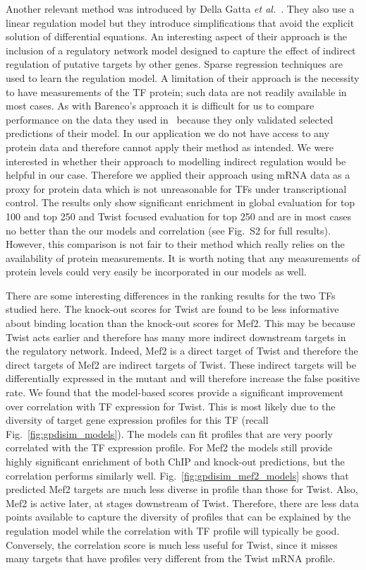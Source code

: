 \documentclass{pnastwo}
\begin{document}
\begin{article}
Another relevant method was introduced by Della Gatta {\em et
  al.}~\cite{Gatta2008}. They also use a linear regulation model but
they introduce simplifications that avoid the explicit solution of
differential equations. An interesting aspect of their approach is the
inclusion of a regulatory network model designed to capture the effect
of indirect regulation of putative targets by other genes. Sparse regression
techniques are used to learn the regulation model. A limitation of
their approach is the necessity to have measurements of the TF
protein; such data are not readily available in most cases. As with
Barenco's approach it is difficult for us to compare performance on
the data they used in~\cite{Gatta2008} because they only validated
selected predictions of their model. In our application we do not have
access to any protein data and therefore cannot apply their method as
intended. We were interested in whether
their approach to modelling indirect regulation would be helpful in
our case. Therefore we applied their approach using mRNA data as a
proxy for protein data which is not unreasonable for TFs under
transcriptional control. The results only show significant
enrichment in global evaluation for top 100 and top 250 and Twist
focused evaluation for top 250 and are in most cases no better than
the our models and correlation (see Fig.~S2 for full
results).
However, this comparison is
not fair to their method which really relies on the
availability of protein measurements.
It is worth noting that any measurements of
protein levels could very easily be incorporated in our models as well.

There are some interesting differences in the ranking results for the two TFs studied
here. The knock-out scores for Twist are found to be less informative
about binding location than the knock-out scores for Mef2. This may be
because Twist acts earlier and therefore has many more indirect
downstream targets in the regulatory network. Indeed, Mef2 is a
direct target of Twist and therefore the direct targets of Mef2 are
indirect targets of Twist. These indirect targets will be
differentially expressed in the mutant and will therefore increase the
false positive rate. We found that the model-based scores provide 
a significant improvement over correlation with TF expression for Twist. 
This is most likely due to the diversity of target gene expression profiles
 for this TF (recall Fig.~\ref{fig:gpdisim_models}). The models can fit 
profiles that are very poorly correlated with the TF expression profile. For Mef2
the models still provide highly significant enrichment of both ChIP and knock-out 
predictions, but the correlation performs similarly well. Fig.~\ref{fig:gpdisim_mef2_models} 
shows that predicted Mef2 targets are much less diverse in profile than those for Twist. Also, Mef2 is
active later, at stages downstream of Twist. Therefore, there
are less data points available to capture the diversity of profiles
that can be explained by the regulation model while the correlation with TF profile will typically be good. Conversely, the
correlation score is much less useful for Twist, since it misses many
targets that have profiles very different from the Twist mRNA profile. 


\end{article}
\end{document}
